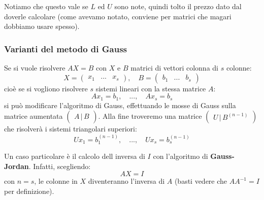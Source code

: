 \documentclass[a4paper,11pt]{article}
\begin{document}
Notiamo che questo vale se $L$ ed $U$ sono note, quindi tolto il prezzo dato dal doverle calcolare (come avevamo notato, conviene per matrici che magari dobbiamo usare spesso).

\subsubsection{Varianti del metodo di Gauss}
Se si vuole risolvere $AX = B$ con $X$ e $B$ matrici di vettori colonna di $s$ colonne:
$$
X = \begin{pmatrix}
	x_1 & ... & x_s
\end{pmatrix}, \quad
B = \begin{pmatrix}
	b_1 & ... & b_s
\end{pmatrix}
$$
cioè se si vogliono risolvere $s$ sistemi lineari con la stessa matrice $A$:
$$
Ax_1 = b_1, \quad ..., \quad Ax_s = b_s
$$
si può modificare l'algoritmo di Gauss, effettuando le mosse di Gauss sulla matrice aumentata $\begin{pmatrix}
	A \, | \, B
\end{pmatrix}$.
Alla fine troveremo una matrice $\begin{pmatrix}
	U \, | \, B^{(n - 1)}
\end{pmatrix}$ che risolverà i sistemi triangolari superiori:
$$
Ux_1 = b_1^{(n - 1)}, \quad ..., \quad Ux_s = b_s^{(n - 1)}
$$

Un caso particolare è il calcolo dell inversa di $I$ con l'algoritmo di \textbf{Gauss-Jordan}.
Infatti, scegliendo:
$$
AX = I
$$
con $n = s$, le colonne in $X$ diventeranno l'inversa di $A$ (basti vedere che $A A^{-1} = I$ per definizione).
\end{document}
